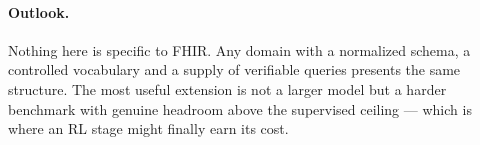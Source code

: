 \documentclass[pmlr,twocolumn,10pt]{jmlr} %
\begin{document}
\paragraph{Outlook.} Nothing here is specific to FHIR. Any domain with a
normalized schema, a controlled vocabulary and a supply of verifiable queries
presents the same structure. The most useful extension is not a larger model but
a harder benchmark with genuine headroom above the supervised ceiling --- which
is where an RL stage might finally earn its cost.


\end{document}
